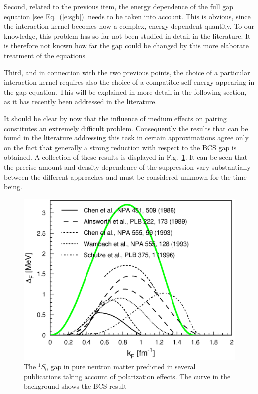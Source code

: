 \documentclass[runningheads]{svmult}
\def\ss{^1\!S_0}
\begin{document}
Second, related to the previous item, the energy dependence 
of the full gap equation [see Eq.~(\ref{e:sgb})] needs to be 
taken into account.
This is obvious, since the interaction kernel becomes now a complex,
energy-dependent quantity.
To our knowledge, this problem has so far not been studied in detail 
in the literature. 
It is therefore not known how far the gap could be changed by this
more elaborate treatment of the equations.

Third, and in connection with the two previous points,
the choice of a particular interaction kernel 
requires also the choice of a compatible self-energy appearing in the 
gap equation.
This will be explained in more detail in the following section, as it has
recently been addressed in the literature.

It should be clear by now that the influence of medium effects on pairing
constitutes an extremely difficult problem.
Consequently the results that can be found in the literature 
\cite{CHEN93,CLARK1,CHEN86,AINS89,WAMBACH,SCHU}
addressing this task in certain approximations agree only on the fact that
generally a strong reduction with respect to the BCS gap is obtained.
A collection of these results is displayed in Fig.~\ref{f:polgap}. 
It can be seen that the precise amount and density dependence of the 
suppression vary substantially between the different approaches 
and must be considered unknown for the time being.
\begin{figure}[b] %
\includegraphics[height=.4\textheight,bb=40 380 40 690]{nsbk_pol.ps}
\caption[]
{The $\ss$ gap in pure neutron matter predicted in several publications
taking account of polarization effects.
The curve in the background shows the BCS result}
\label{f:polgap}
\end{figure} %
\end{document}
